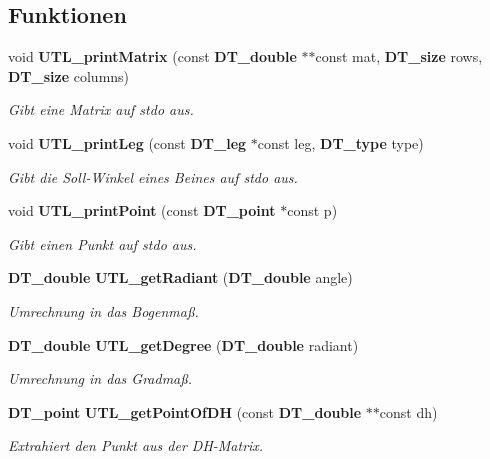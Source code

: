 \subsection*{Funktionen}
\begin{DoxyCompactItemize}
\item 
void {\bf UTL\_\-printMatrix} (const {\bf DT\_\-double} $\ast$$\ast$const mat, {\bf DT\_\-size} rows, {\bf DT\_\-size} columns)
\begin{DoxyCompactList}\small\item\em Gibt eine Matrix auf stdo aus. \item\end{DoxyCompactList}\item 
void {\bf UTL\_\-printLeg} (const {\bf DT\_\-leg} $\ast$const leg, {\bf DT\_\-type} type)
\begin{DoxyCompactList}\small\item\em Gibt die Soll-\/Winkel eines Beines auf stdo aus. \item\end{DoxyCompactList}\item 
void {\bf UTL\_\-printPoint} (const {\bf DT\_\-point} $\ast$const p)
\begin{DoxyCompactList}\small\item\em Gibt einen Punkt auf stdo aus. \item\end{DoxyCompactList}\item 
{\bf DT\_\-double} {\bf UTL\_\-getRadiant} ({\bf DT\_\-double} angle)
\begin{DoxyCompactList}\small\item\em Umrechnung in das Bogenmaß. \item\end{DoxyCompactList}\item 
{\bf DT\_\-double} {\bf UTL\_\-getDegree} ({\bf DT\_\-double} radiant)
\begin{DoxyCompactList}\small\item\em Umrechnung in das Gradmaß. \item\end{DoxyCompactList}\item 
{\bf DT\_\-point} {\bf UTL\_\-getPointOfDH} (const {\bf DT\_\-double} $\ast$$\ast$const dh)
\begin{DoxyCompactList}\small\item\em Extrahiert den Punkt aus der DH-\/Matrix. \item\end{DoxyCompactList}\item 

\end{DoxyCompactItemize}
